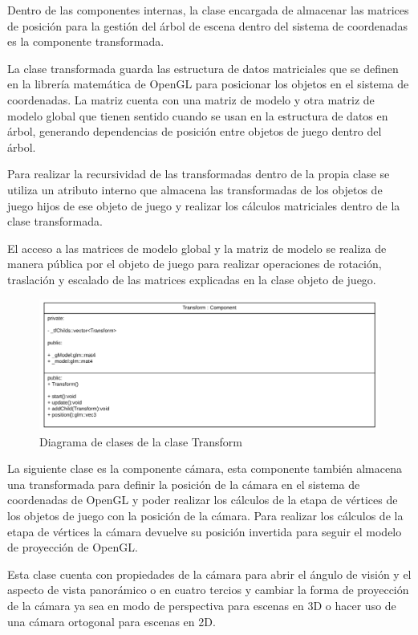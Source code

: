 \documentclass[a4paper, 17pt]{book}
\begin{document}
Dentro de las componentes internas, la clase encargada de almacenar las matrices de posición para la gestión del árbol de escena dentro
del sistema de coordenadas es la componente transformada.

La clase transformada guarda las estructura de datos matriciales que se definen en la librería matemática de OpenGL para posicionar los
objetos en el sistema de coordenadas. La matriz cuenta con una matriz de modelo y otra matriz de modelo global que tienen sentido cuando
se usan en la estructura de datos en árbol, generando dependencias de posición entre objetos de juego dentro del árbol.

Para realizar la recursividad de las transformadas dentro de la propia clase se utiliza un atributo interno que almacena las transformadas
de los objetos de juego hijos de ese objeto de juego y realizar los cálculos matriciales dentro de la clase transformada.

El acceso a las matrices de modelo global y la matriz de modelo se realiza de manera pública por el objeto de juego para realizar operaciones
de rotación, traslación y escalado de las matrices explicadas en la clase objeto de juego.

\begin{figure}[hbt!]
    \centering
    \includegraphics[scale=0.2, keepaspectratio]{img/Transform.png}
    \caption{Diagrama de clases de la clase Transform}
    \label{figura:Component}
\end{figure}

La siguiente clase es la componente cámara, esta componente también almacena una transformada para definir la posición de la cámara en el
sistema de coordenadas de OpenGL y poder realizar los cálculos de la etapa de vértices de los objetos de juego con la posición de la cámara.
Para realizar los cálculos de la etapa de vértices la cámara devuelve su posición invertida para seguir el modelo de proyección de OpenGL.

Esta clase cuenta con propiedades de la cámara para abrir el ángulo de visión y el aspecto de vista panorámico o en cuatro tercios y cambiar
la forma de proyección de la cámara ya sea en modo de perspectiva para escenas en 3D o hacer uso de una cámara ortogonal para 
escenas en 2D.
\end{document}
